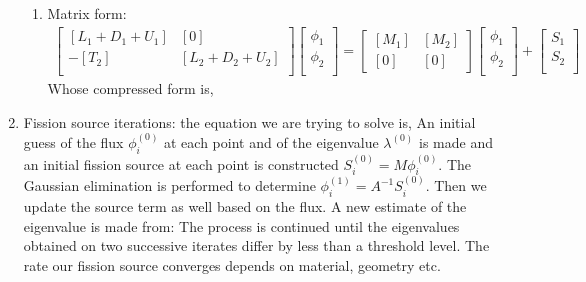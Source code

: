 \documentclass{school-22.211-notes}
\begin{document}
\begin{enumerate}
\begin{enumerate}
    \item Matrix form: 
      \begin{align}
        \left[ \begin{array}{cc} 
            [L_1 + D_1 + U_1] & [0] \\
            -[T_2] & [L_2 + D_2 + U_2] \\
          \end{array} \right] 
        \left[ \begin{array}{c}
            \phi_1 \\ \phi_2 \\ \end{array} \right] 
        = \left[ {\begin{array}{cc} \left[M_1\right] & \left[M_2\right] \\ \left[0\right] & \left[0\right] \end{array}} \right] 
        \left[ \begin{array}{c}
            \phi_1 \\ \phi_2 \\ \end{array} \right] 
        + 
        \left[ \begin{array}{c} 
            S_1 \\ S_2 \\ \end{array} \right] 
      \end{align}
      Whose compressed form is, 
      \eqn{ [A] [\phi] = [M] [\phi] + [S] }
\end{enumerate}


\item Fission source iterations: the equation we are trying to solve is,
An initial guess of the flux $\phi_i^{(0)}$ at each point and of the eigenvalue $\lambda^{(0)}$ is made and an initial fission source at each point is constructed $S_i^{(0)} = M \phi_i^{(0)}$. The Gaussian elimination is performed to determine $\phi_i^{(1)} = A^{-1} S_i^{(0)}$. Then we update the source term as well based on the flux. A new estimate of the eigenvalue is made from: 
The process is continued until the eigenvalues obtained on two successive iterates differ by less than a threshold level. The rate our fission source converges depends on material, geometry etc.


\end{enumerate}
\end{document}
